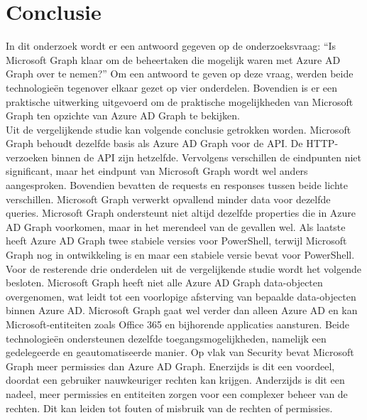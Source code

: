 
\chapter{Conclusie}%
\label{ch:conclusie}



In dit onderzoek wordt er een antwoord gegeven op de onderzoeksvraag: “Is Microsoft Graph klaar om de beheertaken die mogelijk waren met Azure AD Graph over te nemen?” Om een antwoord te geven op deze vraag, werden beide technologieën tegenover elkaar gezet op vier onderdelen. Bovendien is er een praktische uitwerking uitgevoerd om de praktische mogelijkheden van Microsoft Graph ten opzichte van Azure \Ac{AD} Graph te bekijken. \\

Uit de vergelijkende studie kan volgende conclusie getrokken worden. Microsoft Graph behoudt dezelfde basis als Azure \Ac{AD} Graph voor de \Ac{API}. De \Ac{HTTP}-verzoeken binnen de \Ac{API} zijn hetzelfde. Vervolgens verschillen de eindpunten niet significant, maar het eindpunt van Microsoft Graph wordt wel anders aangesproken. Bovendien bevatten de requests en responses tussen beide lichte verschillen. Microsoft Graph verwerkt opvallend minder data voor dezelfde queries. Microsoft Graph ondersteunt niet altijd dezelfde properties die in Azure \Ac{AD} Graph voorkomen, maar in het merendeel van de gevallen wel. Als laatste heeft Azure \Ac{AD} Graph twee stabiele versies voor PowerShell, terwijl Microsoft Graph nog in ontwikkeling is en maar een stabiele versie bevat voor PowerShell. \\

Voor de resterende drie onderdelen uit de vergelijkende studie wordt het volgende besloten. Microsoft Graph heeft niet alle Azure \Ac{AD} Graph data-objecten overgenomen, wat leidt tot een voorlopige afsterving van bepaalde data-objecten binnen Azure \Ac{AD}. Microsoft Graph gaat wel verder dan alleen Azure \Ac{AD} en kan Microsoft-entiteiten zoals Office 365 en bijhorende applicaties aansturen. Beide technologieën ondersteunen dezelfde toegangsmogelijkheden, namelijk een gedelegeerde en geautomatiseerde manier. Op vlak van Security bevat Microsoft Graph meer permissies dan Azure \Ac{AD} Graph. Enerzijds is dit een voordeel, doordat een gebruiker nauwkeuriger rechten kan krijgen. Anderzijds is dit een nadeel, meer permissies en entiteiten zorgen voor een complexer beheer van de rechten. Dit kan leiden tot fouten of misbruik van de rechten of permissies. \\ 

